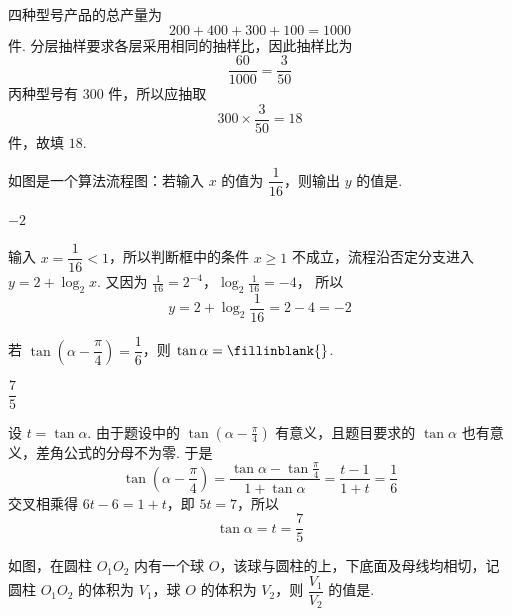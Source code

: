 \begin{solution}
四种型号产品的总产量为
\[
200+400+300+100=1000
\]
件. 分层抽样要求各层采用相同的抽样比，因此抽样比为
\[
\frac{60}{1000}=\frac3{50}
\]
丙种型号有 \(300\) 件，所以应抽取
\[
300\times\frac3{50}=18
\]
件，故填 \(18\).
\end{solution}



\begin{problem}
如图是一个算法流程图：若输入 \(x\) 的值为 \(\dfrac{1}{16}\)，则输出 \(y\) 的值是\fillinblank{}.

\end{problem}

\begin{answer}
\(-2\)
\end{answer}

\begin{solution}
输入 \(x=\dfrac1{16}<1\)，所以判断框中的条件 \(x\ge1\) 不成立，流程沿否定分支进入 \(y=2+\log_2x\). 又因为
\(\frac1{16}=2^{-4}\)，\(\log_2\frac1{16}=-4\)，
所以
\[
y=2+\log_2\frac1{16}=2-4=-2
\]
\end{solution}



\begin{problem}
若 \(\tan\!\left(\alpha-\dfrac{\pi}{4}\right)=\dfrac16\)，则 \(\tan\alpha=\fillinblank{}\).
\end{problem}

\begin{answer}
\(\dfrac75\)
\end{answer}

\begin{solution}
设 \(t=\tan\alpha\). 由于题设中的 \(\tan(\alpha-\frac\pi4)\) 有意义，且题目要求的 \(\tan\alpha\) 也有意义，差角公式的分母不为零. 于是
\[
\tan\left(\alpha-\frac\pi4\right)
=\frac{\tan\alpha-\tan\frac\pi4}{1+\tan\alpha}
=\frac{t-1}{1+t}=\frac16
\]
交叉相乘得 \(6t-6=1+t\)，即 \(5t=7\)，所以
\[
\tan\alpha=t=\frac75
\]
\end{solution}



\begin{problem}
如图，在圆柱 \(O_1O_2\) 内有一个球 \(O\)，该球与圆柱的上，下底面及母线均相切，记圆柱 \(O_1O_2\) 的体积为 \(V_1\)，球 \(O\) 的体积为 \(V_2\)，则 \(\dfrac{V_1}{V_2}\) 的值是\fillinblank{}.

\end{problem}


